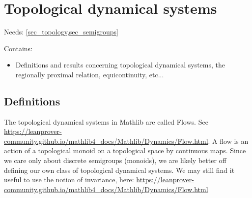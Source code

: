 \section{Topological dynamical systems}
\label{sec_topological_dynamical_systems}

Needs: \cref{sec_topology,sec_semigroups}

Contains:
\begin{itemize}
    \item Definitions and results concerning topological dynamical systems, the regionally proximal relation, equicontinuity, etc...
\end{itemize}

\subsection{Definitions}

\begin{leanrmk}
    The topological dynamical systems in Mathlib are called Flows.  See \url{https://leanprover-community.github.io/mathlib4_docs/Mathlib/Dynamics/Flow.html}.  A flow is an action of a topological monoid on a topological space by continuous maps.  Since we care only about discrete semigroups (monoids), we are likely better off defining our own class of topological dynamical systems.  We may still find it useful to use the notion of invariance, here: \url{https://leanprover-community.github.io/mathlib4_docs/Mathlib/Dynamics/Flow.html}
\end{leanrmk}

